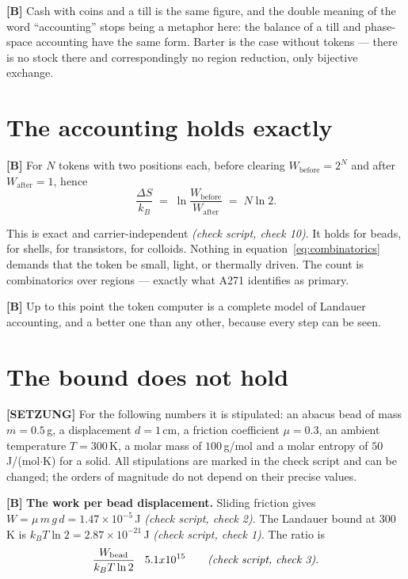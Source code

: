 \textbf{[B]} Cash with coins and a till is the same figure, and the double meaning of the
word “accounting” stops being a metaphor here: the balance of a till and
phase-space accounting have the same form. Barter is the case without tokens ---
there is no stock there and correspondingly no region reduction, only bijective
exchange.

\section{The accounting holds exactly}

\textbf{[B]} For $N$ tokens with two positions each, before clearing
$W_{\text{before}} = 2^N$ and after $W_{\text{after}} = 1$, hence
\begin{equation}
  \frac{\Delta S}{k_B} \;=\; \ln\frac{W_{\text{before}}}{W_{\text{after}}}
  \;=\; N \ln 2 .
  \label{eq:combinatorics}
\end{equation}

This is exact and carrier-independent \emph{(check script, check 10)}. It holds for beads, for
shells, for transistors, for colloids. Nothing in
equation~\eqref{eq:combinatorics} demands that the token be small, light, or
thermally driven. The count is combinatorics over regions --- exactly what A271
identifies as primary.

\textbf{[B]} Up to this point the token computer is a complete model of Landauer
accounting, and a better one than any other, because every step can be seen.

\section{The bound does not hold}

\textbf{[SETZUNG]} For the following numbers it is stipulated: an abacus bead of mass
$m = 0.5$\,g, a displacement $d = 1$\,cm, a friction coefficient $\mu = 0.3$, an
ambient temperature $T = 300$\,K, a molar mass of $100$\,g/mol and a molar entropy
of $50$\,J/(mol$\cdot$K) for a solid. All stipulations are marked in the check
script and can be changed; the orders of magnitude do not depend on their precise
values.

\textbf{[B]} \textbf{The work per bead displacement.} Sliding friction gives
$W = \mu\,m\,g\,d = 1.47\times10^{-5}$\,J \emph{(check script, check 2)}. The Landauer bound at
300\,K is $k_B T \ln 2 = 2.87\times10^{-21}$\,J \emph{(check script, check 1)}. The ratio is
\begin{equation}
  \frac{W_{\text{bead}}}{k_B T \ln 2} \;\approx\; 5.1\times10^{15}
  \qquad \text{\emph{(check script, check 3)}} .
\end{equation}

